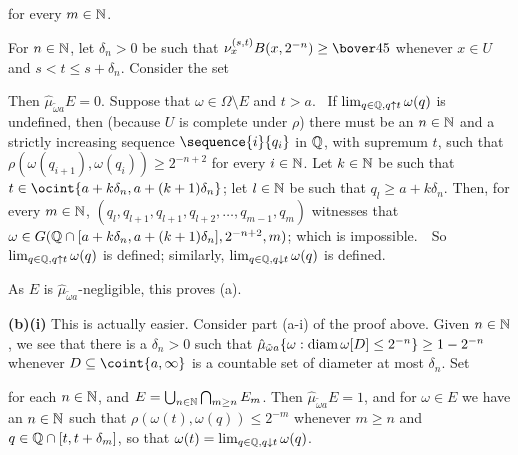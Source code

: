 {

\noindent for every $m\in\Bbb N$.\ \Qed

\medskip

 For $n\in\Bbb N$, let $\delta_n>0$ be such that
$\nu_x^{(s,t)}B(x,2^{-n})\ge\bover45$ whenever $x\in U$ and
$s<t\le s+\delta_n$.   Consider the set


\noindent Then $\hat\mu_{\tilde\omega a}E=0$.   Suppose that
$\omega\in\Omega\setminus E$ and $t>a$.
\Quer\ If $\lim_{q\in\Bbb Q,q\uparrow t}\omega(q)$ is undefined,
then (because $U$ is
complete under $\rho$) there must be an $n\in\Bbb N$ and a strictly
increasing sequence $\sequence{i}{q_i}$ in $\Bbb Q$, with supremum
$t$, such that $\rho(\omega(q_{i+1}),\omega(q_i))\ge 2^{-n+2}$ for every
$i\in\Bbb N$.   Let $k\in\Bbb N$ be such
that $t\in\ocint{a+k\delta_n,a+(k+1)\delta_n}$;  let $l\in\Bbb N$ be such
that $q_l\ge a+k\delta_n$.   Then, for every $m\in\Bbb N$,
$(q_l,q_{l+1},q_{l+1},q_{l+2},\ldots,q_{m-1},q_m)$ witnesses that
$\omega\in G(\Bbb Q\cap[a+k\delta_n,a+(k+1)\delta_n],2^{-n+2},m)$;
which is
impossible.\ \BanG\   So $\lim_{q\in\Bbb Q,q\uparrow t}\omega(q)$ is
defined;  similarly, $\lim_{q\in\Bbb Q,q\downarrow t}\omega(q)$ is defined.

As $E$ is $\hat\mu_{\tilde\omega a}$-negligible, this proves (a).

\medskip

{\bf (b)(i)} This is actually easier.
Consider part (a-i) of the proof above.   Given $n\in\Bbb N$, we
see that there is a $\delta_n>0$ such that
$\hat\mu_{\tilde\omega a}\{\omega:\mathop{\text{diam}}\omega[D]\le 2^{-n}\}
\ge 1-2^{-n}$ whenever $D\subseteq\coint{a,\infty}$ is a countable set of
diameter at most $\delta_n$.   Set


\noindent for each $n\in\Bbb N$, and
$E=\bigcup_{n\in\Bbb N}\bigcap_{m\ge n}E_m$.   Then
$\hat\mu_{\tilde\omega a}E=1$, and for $\omega\in E$ we have an
$n\in\Bbb N$ such that
$\rho(\omega(t),\omega(q))\le 2^{-m}$ whenever $m\ge n$ and
$q\in\Bbb Q\cap[t,t+\delta_m]$, so that
$\omega(t)=\lim_{q\in\Bbb Q,q\downarrow t}\omega(q)$.

\medskip

}
